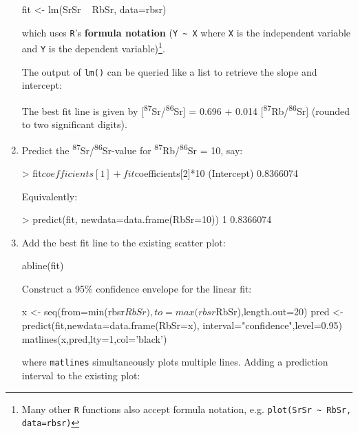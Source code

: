 \begin{enumerate}
\begin{script}[firstnumber=2]
fit <- lm(SrSr ~ RbSr, data=rbsr)
\end{script}

\noindent which uses \texttt{R}'s \textbf{formula notation}
(\verb|Y ~ X| where \texttt{X} is the independent variable and
\texttt{Y} is the dependent variable)\footnote{Many other \texttt{R}
  functions also accept formula notation, e.g. \texttt{plot(SrSr
    \textasciitilde{} RbSr, data=rbsr)}}.

The output of \texttt{lm()} can be queried like a list to retrieve the
slope and intercept:


The best fit line is given by
[\textsuperscript{87}Sr/\textsuperscript{86}Sr] = 0.696 + 0.014
[\textsuperscript{87}Rb/\textsuperscript{86}Sr] (rounded to two
significant digits).

\item Predict the \textsuperscript{87}Sr/\textsuperscript{86}Sr-value
  for \textsuperscript{87}Rb/\textsuperscript{86}Sr = 10, say:
  
\begin{console}
> fit$coefficients[1] + fit$coefficients[2]*10
(Intercept)
  0.8366074 
\end{console}

Equivalently:

\begin{console}
> predict(fit, newdata=data.frame(RbSr=10))
        1 
0.8366074
\end{console}

\item Add the best fit line to the existing scatter plot:

\begin{script}[firstnumber=3]
abline(fit)
\end{script}

Construct a 95\% confidence envelope for the linear fit:

\begin{script}[firstnumber=4]
x <- seq(from=min(rbsr$RbSr),to=max(rbsr$RbSr),length.out=20)
pred <- predict(fit,newdata=data.frame(RbSr=x),
                interval="confidence",level=0.95)
matlines(x,pred,lty=1,col='black')
\end{script}

\noindent where \texttt{matlines} simultaneously plots multiple lines.
Adding a prediction interval to the existing plot:


\end{enumerate}
